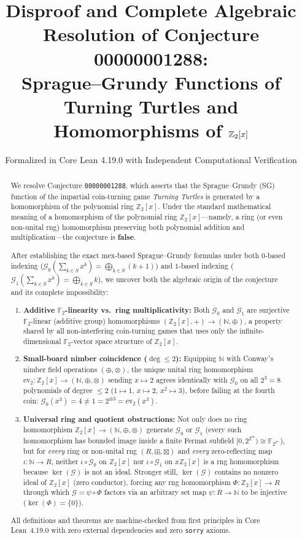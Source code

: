 \documentclass[11pt,a4paper]{article}
\title{\textbf{Disproof and Complete Algebraic Resolution of Conjecture 00000001288:\\
Sprague--Grundy Functions of Turning Turtles and\\
Homomorphisms of $\Z_2[x]$}}
\author{Formalized in Core Lean 4.19.0 with Independent Computational Verification}
\date{}
\theoremstyle{definition}
\newcommand{\F}{\mathbb{F}}
\newcommand{\Z}{\mathbb{Z}}
\newcommand{\N}{\mathbb{N}}
\newcommand{\SG}{\mathcal{G}}
\newcommand{\mex}{\mathrm{mex}}
\newcommand{\ev}{\mathrm{ev}}
\begin{document}
\maketitle

\begin{abstract}
We resolve Conjecture \texttt{00000001288}, which asserts that the Sprague--Grundy (SG)
function of the impartial coin-turning game \emph{Turning Turtles} is generated by a
homomorphism of the polynomial ring $\Z_2[x]$. Under the standard mathematical meaning
of a homomorphism of the polynomial ring $\Z_2[x]$---namely, a ring (or even non-unital
rng) homomorphism preserving both polynomial addition and multiplication---the conjecture
is \textbf{false}.

After establishing the exact $\mex$-based Sprague--Grundy formulas under both $0$-based
indexing ($\SG_0(\sum_{k\in S} x^k) = \bigoplus_{k\in S}(k+1)$) and $1$-based indexing
($\SG_1(\sum_{k\in S} x^k) = \bigoplus_{k\in S} k$), we uncover both the algebraic origin
of the conjecture and its complete impossibility:
\begin{enumerate}
  \setlength{\itemsep}{2pt}
  \item \textbf{Additive $\F_2$-linearity vs.\ ring multiplicativity:} Both $\SG_0$ and
    $\SG_1$ are surjective $\F_2$-linear (additive group) homomorphisms
    $(\Z_2[x],+) \to (\N,\oplus)$, a property shared by all non-interfering coin-turning
    games that uses only the infinite-dimensional $\F_2$-vector space structure of $\Z_2[x]$.
  \item \textbf{Small-board nimber coincidence ($\deg \le 2$):} Equipping $\N$ with
    Conway's nimber field operations $(\oplus,\otimes)$, the unique unital ring
    homomorphism $\ev_2 : \Z_2[x] \to (\N,\oplus,\otimes)$ sending $x \mapsto 2$ agrees
    identically with $\SG_0$ on all $2^3 = 8$ polynomials of degree $\le 2$
    ($1 \mapsto 1$, $x \mapsto 2$, $x^2 \mapsto 3$), before failing at the fourth coin:
    $\SG_0(x^3) = 4 \neq 1 = 2^{\otimes 3} = \ev_2(x^3)$.
  \item \textbf{Universal ring and quotient obstructions:} Not only does no ring
    homomorphism $\Z_2[x] \to (\N,\oplus,\otimes)$ generate $\SG_0$ or $\SG_1$ (every
    such homomorphism has bounded image inside a finite Fermat subfield
    $[0,2^{2^m}) \cong \F_{2^{2^m}}$), but for \emph{every} ring or non-unital rng
    $(R,\boxplus,\boxtimes)$ and \emph{every} zero-reflecting map $\iota : \N \to R$,
    neither $\iota \circ \SG_0$ on $\Z_2[x]$ nor $\iota \circ \SG_1$ on $x\Z_2[x]$ is a
    rng homomorphism because $\ker(\SG)$ is not an ideal. Stronger still, $\ker(\SG)$
    contains no nonzero ideal of $\Z_2[x]$ (zero conductor), forcing any rng homomorphism
    $\Phi : \Z_2[x] \to R$ through which $\SG = \psi \circ \Phi$ factors via an arbitrary
    set map $\psi : R \to \N$ to be injective ($\ker(\Phi)=\{0\}$).
\end{enumerate}
All definitions and theorems are machine-checked from first principles in Core Lean~4.19.0
with zero external dependencies and zero \texttt{sorry} axioms.
\end{abstract}
\end{document}
